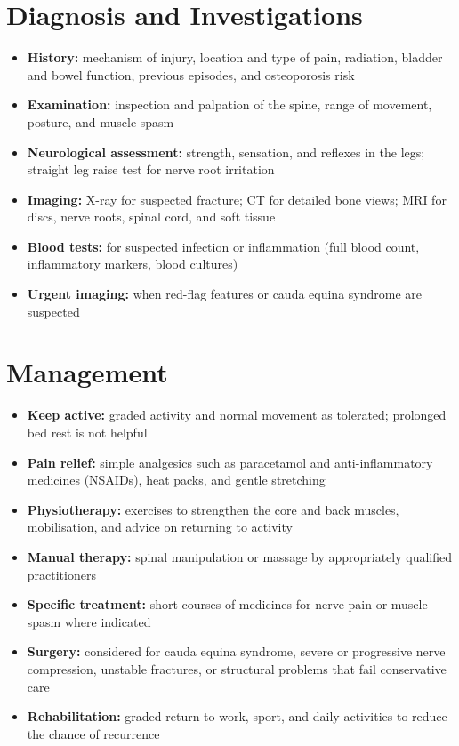 \section*{Diagnosis and Investigations}
\begin{itemize}
    \item \textbf{History:} mechanism of injury, location and type of pain, radiation, bladder and bowel function, previous episodes, and osteoporosis risk
    \item \textbf{Examination:} inspection and palpation of the spine, range of movement, posture, and muscle spasm
    \item \textbf{Neurological assessment:} strength, sensation, and reflexes in the legs; straight leg raise test for nerve root irritation
    \item \textbf{Imaging:} X-ray for suspected fracture; CT for detailed bone views; MRI for discs, nerve roots, spinal cord, and soft tissue
    \item \textbf{Blood tests:} for suspected infection or inflammation (full blood count, inflammatory markers, blood cultures)
    \item \textbf{Urgent imaging:} when red-flag features or cauda equina syndrome are suspected
\end{itemize}

\section*{Management}
\begin{itemize}
    \item \textbf{Keep active:} graded activity and normal movement as tolerated; prolonged bed rest is not helpful
    \item \textbf{Pain relief:} simple analgesics such as paracetamol and anti-inflammatory medicines (NSAIDs), heat packs, and gentle stretching
    \item \textbf{Physiotherapy:} exercises to strengthen the core and back muscles, mobilisation, and advice on returning to activity
    \item \textbf{Manual therapy:} spinal manipulation or massage by appropriately qualified practitioners
    \item \textbf{Specific treatment:} short courses of medicines for nerve pain or muscle spasm where indicated
    \item \textbf{Surgery:} considered for cauda equina syndrome, severe or progressive nerve compression, unstable fractures, or structural problems that fail conservative care
    \item \textbf{Rehabilitation:} graded return to work, sport, and daily activities to reduce the chance of recurrence
\end{itemize}

